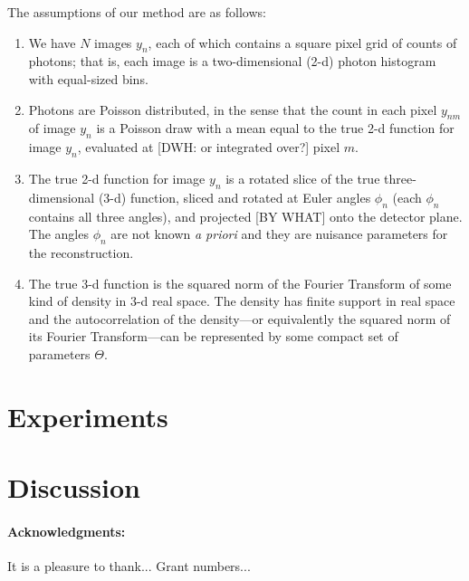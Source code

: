 \documentclass[12pt, letterpaper]{article}
\newcommand{\foreign}[1]{\textsl{#1}}
\newcommand{\pars}{\Theta}
\newcommand{\image}{y}
\newcommand{\angles}{\phi}
\begin{document}
The assumptions of our method are as follows:
\begin{enumerate}
\item We have $N$ images $\image_n$, each of which contains a square
  pixel grid of counts of photons; that is, each image is a
  two-dimensional (2-d) photon histogram with equal-sized bins.
\item Photons are Poisson distributed, in the sense that the count in
  each pixel $\image_{nm}$ of image $\image_n$ is a Poisson draw with
  a mean equal to the true 2-d function for image $\image_n$,
  evaluated at [DWH: or integrated over?] pixel $m$.
\item The true 2-d function for image $\image_n$ is a rotated slice of
  the true three-dimensional (3-d) function, sliced and rotated at
  Euler angles $\angles_n$ (each $\angles_n$ contains all three
  angles), and projected [BY WHAT] onto the detector plane.  The
  angles $\angles_n$ are not known \foreign{a priori} and they are
  nuisance parameters for the reconstruction.
\item The true 3-d function is the squared norm of the Fourier
  Transform of some kind of density in 3-d real space.  The density
  has finite support in real space and the autocorrelation of the
  density---or equivalently the squared norm of its Fourier
  Transform---can be represented by some compact set of parameters
  $\pars$.
\end{enumerate}

\section{Experiments}

\section{Discussion}

\paragraph{Acknowledgments:}
It is a pleasure to thank...
Grant numbers...
\end{document}
